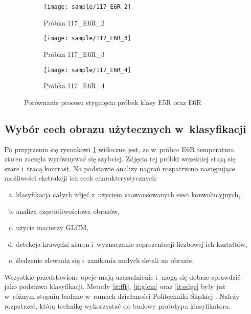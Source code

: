 \begin{figure}[htbp]
\begin{subfigure}{0.3\textwidth}
	\end{subfigure}
	\hspace{0.25cm}
	\vspace{0.5cm}
	\begin{subfigure}{0.3\textwidth}
		\centering
		\texttt{[image: sample/117\_E6R\_2]}
		\caption{Próbka 117\_E6R\_2}
	\end{subfigure}
	\hspace{0.25cm}
	\begin{subfigure}{0.3\textwidth}
		\centering
		\texttt{[image: sample/117\_E6R\_3]}
		\caption{Próbka 117\_E6R\_3}
	\end{subfigure}
	\begin{subfigure}{0.3\textwidth}
		\centering
		\texttt{[image: sample/117\_E6R\_4]}
		\caption{Próbka 117\_E6R\_4}
	\end{subfigure}
	\caption{Porównanie procesu stygnięcia próbek klasy E5R oraz E6R}
	\label{fig:sample_compare}
\end{figure}

\subsection{Wybór cech obrazu użytecznych w~klasyfikacji}
\label{subsec:feature_extraction}
Po przyjrzeniu się rysunkowi \ref{fig:sample_compare} widoczne jest, że
w~próbce E6R temperatura ziaren zaczęła wyrównywać się szybciej.
Zdjęcia tej próbki wcześniej stają się szare i~tracą kontrast.
Na podstawie analizy nagrań rozpatrzono następujące możliwości ekstrakcji
ich cech charakterystycznych:
\begin{enumerate}[a)]
	\item \label{it:cnn}
	      klasyfikacja całych zdjęć z~użyciem zaawansowanych sieci
	      konwolucyjnych,
	\item \label{it:fft}
	      analiza częstotliwościowa obrazów,
	\item \label{it:glcm}
	      użycie macierzy GLCM,
	\item \label{it:edge}
	      detekcja krawędzi ziaren i~wyznaczanie reprezentacji liczbowej
	      ich kształtów,
	\item \label{it:blob}
	      śledzenie zlewania się i~zanikania małych detali na obrazie.
\end{enumerate}
Wszystkie przedstawione opcje mają uzasadnienie i~mogą się dobrze sprawdzić
jako podstawa klasyfikacji.
Metody \ref{it:fft}, \ref{it:glcm} oraz \ref{it:edge} były już w~różnym
stopniu badane w~ramach działaności Politechniki Śląskiej \cite{budzan_grains}.
Należy rozpatrzeć, którą technikę wykorzystać do budowy prototypu
klasyfikatora.

